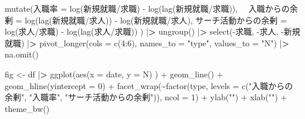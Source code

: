 \documentclass[
]{book}
\newenvironment{Shaded}{\begin{snugshade}}{\end{snugshade}}
\newcommand{\AttributeTok}[1]{\textcolor[rgb]{0.77,0.63,0.00}{#1}}
\newcommand{\DecValTok}[1]{\textcolor[rgb]{0.00,0.00,0.81}{#1}}
\newcommand{\ErrorTok}[1]{\textcolor[rgb]{0.64,0.00,0.00}{\textbf{#1}}}
\newcommand{\FunctionTok}[1]{\textcolor[rgb]{0.00,0.00,0.00}{#1}}
\newcommand{\NormalTok}[1]{#1}
\newcommand{\OtherTok}[1]{\textcolor[rgb]{0.56,0.35,0.01}{#1}}
\newcommand{\SpecialCharTok}[1]{\textcolor[rgb]{0.00,0.00,0.00}{#1}}
\newcommand{\StringTok}[1]{\textcolor[rgb]{0.31,0.60,0.02}{#1}}
\begin{document}
\begin{Shaded}
\begin{Highlighting}[]
  \FunctionTok{mutate}\NormalTok{(入職率 }\OtherTok{=} \FunctionTok{log}\NormalTok{(新規就職}\SpecialCharTok{/}\NormalTok{求職) }\SpecialCharTok{{-}} \FunctionTok{log}\NormalTok{(}\FunctionTok{lag}\NormalTok{(新規就職}\SpecialCharTok{/}\NormalTok{求職)),}
\NormalTok{        　入職からの余剰 }\OtherTok{=} \FunctionTok{log}\NormalTok{(}\FunctionTok{lag}\NormalTok{(新規就職}\SpecialCharTok{/}\NormalTok{求人)) }\SpecialCharTok{{-}} \FunctionTok{log}\NormalTok{(新規就職}\SpecialCharTok{/}\NormalTok{求人),}
\NormalTok{           サーチ活動からの余剰 }\OtherTok{=} \FunctionTok{log}\NormalTok{(求人}\SpecialCharTok{/}\NormalTok{求職) }\SpecialCharTok{{-}} \FunctionTok{log}\NormalTok{(}\FunctionTok{lag}\NormalTok{(求人}\SpecialCharTok{/}\NormalTok{求職))}
\NormalTok{           ) }\SpecialCharTok{|}\ErrorTok{\textgreater{}} 
  \FunctionTok{ungroup}\NormalTok{() }\SpecialCharTok{|}\ErrorTok{\textgreater{}} 
  \FunctionTok{select}\NormalTok{(}\SpecialCharTok{{-}}\NormalTok{求職,}
         \SpecialCharTok{{-}}\NormalTok{求人,}
         \SpecialCharTok{{-}}\NormalTok{新規就職) }\SpecialCharTok{|}\ErrorTok{\textgreater{}} 
  \FunctionTok{pivot\_longer}\NormalTok{(}\AttributeTok{cols =} \FunctionTok{c}\NormalTok{(}\DecValTok{4}\SpecialCharTok{:}\DecValTok{6}\NormalTok{),}
               \AttributeTok{names\_to =} \StringTok{"type"}\NormalTok{,}
               \AttributeTok{values\_to =} \StringTok{"N"}\NormalTok{) }\SpecialCharTok{|}\ErrorTok{\textgreater{}} 
  \FunctionTok{na.omit}\NormalTok{()}

\NormalTok{fig }\OtherTok{\textless{}{-}}
\NormalTok{  df }\SpecialCharTok{|}\ErrorTok{\textgreater{}} 
  \FunctionTok{ggplot}\NormalTok{(}\FunctionTok{aes}\NormalTok{(}\AttributeTok{x =}\NormalTok{ date,}
             \AttributeTok{y =}\NormalTok{ N)}
\NormalTok{         ) }\SpecialCharTok{+}
  \FunctionTok{geom\_line}\NormalTok{() }\SpecialCharTok{+}
  \FunctionTok{geom\_hline}\NormalTok{(}\AttributeTok{yintercept =} \DecValTok{0}\NormalTok{) }\SpecialCharTok{+}
  \FunctionTok{facet\_wrap}\NormalTok{(}\SpecialCharTok{\textasciitilde{}}\FunctionTok{factor}\NormalTok{(type,}
                     \AttributeTok{levels =} \FunctionTok{c}\NormalTok{(}\StringTok{"入職からの余剰"}\NormalTok{,}
                                \StringTok{"入職率"}\NormalTok{,}
                                \StringTok{"サーチ活動からの余剰"}\NormalTok{)),}
             \AttributeTok{ncol =} \DecValTok{1}\NormalTok{) }\SpecialCharTok{+}
  \FunctionTok{ylab}\NormalTok{(}\StringTok{""}\NormalTok{) }\SpecialCharTok{+}
  \FunctionTok{xlab}\NormalTok{(}\StringTok{""}\NormalTok{) }\SpecialCharTok{+}
  \FunctionTok{theme\_bw}\NormalTok{()}
\end{Highlighting}
\end{Shaded}
\end{document}
